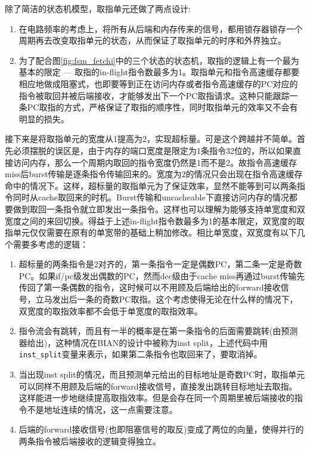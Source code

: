 除了简洁的状态机模型，取指单元还做了两点设计:
\begin{enumerate}[label=(\alph*)]
	\item 在电路频率的考虑上，将所有从后端和内存传来的信号，都用锁存器锁存一个周期再去改变取指单元的状态，从而保证了取指单元的时序和外界独立。
	\item 为了配合图\ref{fig:fsm_fetchi}中的三个状态的状态机，取指的逻辑上有一个最为基本的限定 --- 取指的in-flight指令数最多为1。取指单元和指令高速缓存都要相应地做成阻塞式，也即要等到正在访问内存或者指令高速缓存的PC对应的指令被取回并被后端接收，才能够发出下一个PC取指请求。这种只能跟踪一条PC取指的方式，严格保证了取指的顺序性，同时取指单元的效率又不会有明显的损失。
\end{enumerate}

接下来是将取指单元的宽度从1提高为2，实现超标量。可是这个跨越并不简单。首先必须摆脱的误区是，由于内存的端口宽度是限定为1条指令32位的，所以如果直接访问内存，那么一个周期内取回的指令宽度仍然是1而不是2。故指令高速缓存miss后burst传输是逐条指令传输回来的。宽度为2的情况只会出现在指令高速缓存命中的情况下。这样，超标量的取指单元为了保证效率，显然不能等到可以两条指令同时从cache取回来的时机。Burst传输和uncacheable下直接访问内存的情况都要做到取回一条指令就立即发出一条指令。这样也可以理解为能够支持单宽度和双宽度之间的来回切换。得益于上述in-flight指令数最多为1的基本限定，双宽度的取指单元仅仅需要在原有的单宽带的基础上稍加修改。相比单宽度，双宽度有以下几个需要多考虑的逻辑：
\begin{enumerate}[label=(\alph*)]
	\item 超标量的两条指令是2对齐的，第一条指令一定是偶数PC，第二条一定是奇数PC。如果if/pc级发出偶数的PC，然而dec级由于cache miss再通过burst传输先传回了第一条偶数的指令，这时候可以不用顾及后端给出的forward接收信号，立马发出后一条的奇数PC取指。这个考虑使得无论在什么样的情况下，双宽度的取指效率都不会低于单宽度的取指效率。
	\item 指令流会有跳转，而且有一半的概率是在第一条指令的后面需要跳转(由预测器给出)，这种情况在BIAN的设计中被称为inst split，上述代码中用\texttt{inst\_split}变量来表示，如果第二条指令也取回来了，要取消掉。
	\item 当出现inst split的情况，而且预测单元给出的目标地址是奇数PC时，取指单元可以同样不用顾及后端的forward接收信号，直接发出跳转目标地址去取指。这样能进一步地继续提高取指效率。但是会存在同一个周期里被后端接收的指令不是地址连续的情况，这一点需要注意。
	\item 后端的forward接收信号(也即阻塞信号的取反)变成了两位的向量，使得并行的两条指令被后端接收的逻辑变得独立。
\end{enumerate}

